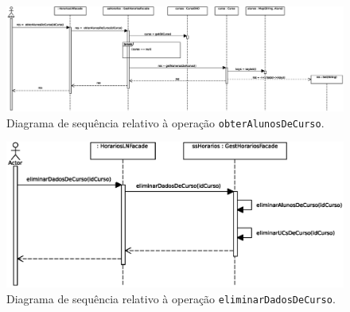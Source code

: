 \documentclass[12pt, a4paper]{article}
\begin{document}
\begin{landscape}
        \vspace*{\fill}
        \pagebreak
        \vspace*{\fill}

        \begin{figure}[H]
            \centering
            \includegraphics[scale=0.70]{Imagens/Modelos/obterAlunosDeCurso.svg.eps}
            \caption{
                Diagrama de sequência relativo à operação \texttt{obterAlunosDeCurso}.
            }
        \end{figure}

        \vspace*{\fill}
        \pagebreak
        \vspace*{\fill}

        \begin{figure}[H]
            \centering
            \includegraphics[scale=1.0]{Imagens/Modelos/eliminarDadosDeCurso.svg.eps}
            \caption{
                Diagrama de sequência relativo à operação \texttt{eliminarDadosDeCurso}.
            }
        \end{figure}

        \vspace*{\fill}
        \pagebreak
        \vspace*{\fill}


\end{landscape}
\end{document}
